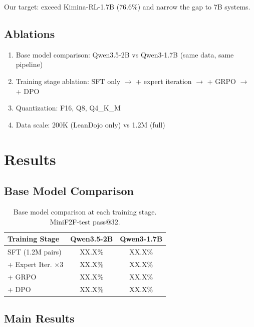 \documentclass[11pt,a4paper]{article}
\begin{document}
Our target: exceed Kimina-RL-1.7B (76.6\%) and narrow the gap to 7B systems.

\subsection{Ablations}

\begin{enumerate}
\item Base model comparison: Qwen3.5-2B vs Qwen3-1.7B (same data, same pipeline)
\item Training stage ablation: SFT only $\rightarrow$ + expert iteration $\rightarrow$ + GRPO $\rightarrow$ + DPO
\item Quantization: F16, Q8, Q4\_K\_M
\item Data scale: 200K (LeanDojo only) vs 1.2M (full)
\end{enumerate}

\section{Results}
\label{sec:results}

\subsection{Base Model Comparison}

\begin{table}[h]
\centering
\caption{Base model comparison at each training stage. MiniF2F-test pass@32.}
\begin{tabular}{lcc}
\toprule
\textbf{Training Stage} & \textbf{Qwen3.5-2B} & \textbf{Qwen3-1.7B} \\
\midrule
SFT (1.2M pairs) & XX.X\% & XX.X\% \\
+ Expert Iter. $\times$3 & XX.X\% & XX.X\% \\
+ GRPO & XX.X\% & XX.X\% \\
+ DPO & XX.X\% & XX.X\% \\
\bottomrule
\end{tabular}
\label{tab:base_model}
\end{table}

\subsection{Main Results}
\end{document}
